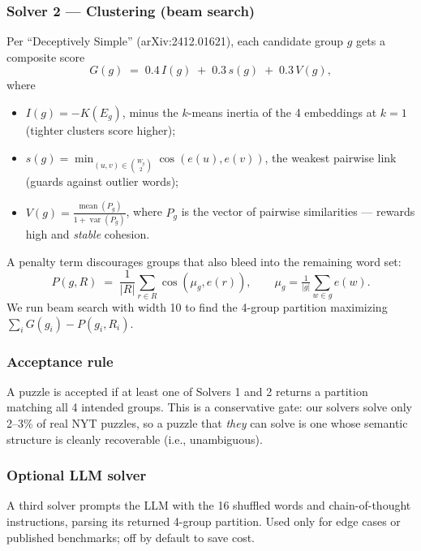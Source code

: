 \documentclass[11pt, letterpaper]{article}
\begin{document}
\subsubsection{Solver 2 --- Clustering (beam search)}
Per ``Deceptively Simple'' (arXiv:2412.01621), each candidate group $g$ gets a
composite score
\begin{equation}
G(g) \;=\; 0.4 \,I(g) \;+\; 0.3 \,s(g) \;+\; 0.3 \,V(g),
\end{equation}
where
\begin{itemize}[leftmargin=*, itemsep=0.1em]
\item $I(g) = -K(E_g)$, minus the $k$-means inertia of the 4 embeddings at $k=1$
(tighter clusters score higher);
\item $s(g) = \min_{(u, v) \in \binom{W_g}{2}} \cos(e(u), e(v))$, the weakest
pairwise link (guards against outlier words);
\item $V(g) = \frac{\operatorname{mean}(P_g)}{1 + \operatorname{var}(P_g)}$, where $P_g$ is the
vector of pairwise similarities --- rewards high and \emph{stable} cohesion.
\end{itemize}
A penalty term discourages groups that also bleed into the remaining word set:
\begin{equation}
P(g, R) \;=\; \frac{1}{|R|} \sum_{r \in R} \cos(\mu_g, e(r)), \qquad \mu_g = \tfrac{1}{|g|} \sum_{w \in g} e(w).
\end{equation}
We run beam search with width 10 to find the 4-group partition maximizing
$\sum_i G(g_i) - P(g_i, R_i)$.

\subsubsection{Acceptance rule}
A puzzle is accepted if at least one of Solvers 1 and 2 returns a partition
matching all 4 intended groups. This is a conservative gate: our solvers solve only
2--3\% of real NYT puzzles, so a puzzle that \emph{they} can solve is one whose
semantic structure is cleanly recoverable (i.e., unambiguous).

\subsubsection{Optional LLM solver}
A third solver prompts the LLM with the 16 shuffled words and chain-of-thought
instructions, parsing its returned 4-group partition. Used only for edge cases
or published benchmarks; off by default to save cost.

\end{document}
